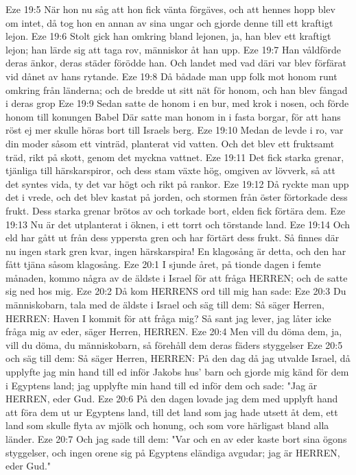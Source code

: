 Eze 19:5  När hon nu såg att hon fick vänta förgäves, och att hennes hopp blev om intet, då tog hon en annan av sina ungar och gjorde denne till ett kraftigt lejon.
Eze 19:6  Stolt gick han omkring bland lejonen, ja, han blev ett kraftigt lejon; han lärde sig att taga rov, människor åt han upp.
Eze 19:7  Han våldförde deras änkor, deras städer förödde han. Och landet med vad däri var blev förfärat vid dånet av hans rytande.
Eze 19:8  Då bådade man upp folk mot honom runt omkring från länderna; och de bredde ut sitt nät för honom, och han blev fångad i deras grop
Eze 19:9  Sedan satte de honom i en bur, med krok i nosen, och förde honom till konungen Babel Där satte man honom in i fasta borgar, för att hans röst ej mer skulle höras bort till Israels berg.
Eze 19:10  Medan de levde i ro, var din moder såsom ett vinträd, planterat vid vatten. Och det blev ett fruktsamt träd, rikt på skott, genom det myckna vattnet.
Eze 19:11  Det fick starka grenar, tjänliga till härskarspiror, och dess stam växte hög, omgiven av lövverk, så att det syntes vida, ty det var högt och rikt på rankor.
Eze 19:12  Då ryckte man upp det i vrede, och det blev kastat på jorden, och stormen från öster förtorkade dess frukt. Dess starka grenar brötos av och torkade bort, elden fick förtära dem.
Eze 19:13  Nu är det utplanterat i öknen, i ett torrt och törstande land.
Eze 19:14  Och eld har gått ut från dess yppersta gren och har förtärt dess frukt. Så finnes där nu ingen stark gren kvar, ingen härskarspira! En klagosång är detta, och den har fått tjäna såsom klagosång.
Eze 20:1  I sjunde året, på tionde dagen i femte månaden, kommo några av de äldste i Israel för att fråga HERREN; och de satte sig ned hos mig.
Eze 20:2  Då kom HERRENS ord till mig han sade:
Eze 20:3  Du människobarn, tala med de äldste i Israel och säg till dem: Så säger Herren, HERREN: Haven I kommit för att fråga mig? Så sant jag lever, jag låter icke fråga mig av eder, säger Herren, HERREN.
Eze 20:4  Men vill du döma dem, ja, vill du döma, du människobarn, så förehåll dem deras fäders styggelser
Eze 20:5  och säg till dem: Så säger Herren, HERREN: På den dag då jag utvalde Israel, då upplyfte jag min hand till ed inför Jakobs hus' barn och gjorde mig känd för dem i Egyptens land; jag upplyfte min hand till ed inför dem och sade: "Jag är HERREN, eder Gud.
Eze 20:6  På den dagen lovade jag dem med upplyft hand att föra dem ut ur Egyptens land, till det land som jag hade utsett åt dem, ett land som skulle flyta av mjölk och honung, och som vore härligast bland alla länder.
Eze 20:7  Och jag sade till dem: "Var och en av eder kaste bort sina ögons styggelser, och ingen orene sig på Egyptens eländiga avgudar; jag är HERREN, eder Gud."
